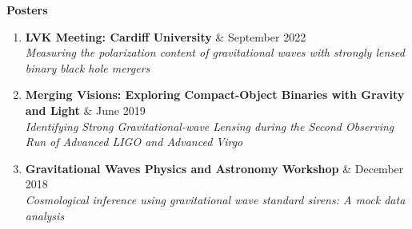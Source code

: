 \documentclass[letterpaper,10pt]{article}
\newcommand{\resheading}[1]{{\large \colorbox{mygrey}{\begin{minipage}{\textwidth}{\textbf{#1 \vphantom{p\^{E}}}}\end{minipage}}}}
\newcommand{\presentation}[3]{
\begin{tabularx}
		\textbf{#1} & \hfill #2 \\
		\textit{#3}\\
\end{tabularx}\vspace{-3pt}}
\begin{document}
\begin{enumerate}
    
    
    
    
	

\end{enumerate}
\resheading{Posters}
\begin{enumerate}
\item
	\presentation{LVK Meeting: Cardiff University}{September 2022}{Measuring the polarization content of gravitational waves with strongly lensed binary black hole mergers}
\item
	\presentation{Merging Visions: Exploring Compact-Object Binaries with Gravity and Light}{June 2019}{Identifying Strong Gravitational-wave Lensing during the Second Observing Run of Advanced LIGO and Advanced Virgo}
\item
	\presentation{Gravitational Waves Physics and Astronomy Workshop}{December 2018}{Cosmological inference using gravitational wave standard sirens: A mock data analysis}
\end{enumerate}
\end{document}
